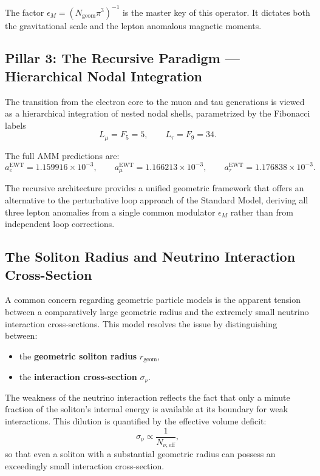 \documentclass[10pt,a4paper]{article}
\begin{document}
The factor \(\epsilon_M = (N_{\text{geom}}\pi^3)^{-1}\) is the master key of this operator. It dictates both the gravitational scale and the lepton anomalous magnetic moments.

\subsection{Pillar 3: The Recursive Paradigm — Hierarchical Nodal Integration}
\label{sec:Pillar3_recursive}

The transition from the electron core to the muon and tau generations is
viewed as a hierarchical integration of nested nodal shells, parametrized
by the Fibonacci labels
\begin{equation}
	L_{\mu} = F_5 = 5,
	\qquad
	L_{\tau} = F_9 = 34.
\end{equation}

The full AMM predictions are:
\begin{equation}
	a_e^{\text{EWT}} = 1.159916 \times 10^{-3},
	\qquad
	a_\mu^{\text{EWT}} = 1.166213 \times 10^{-3},
	\qquad
	a_\tau^{\text{EWT}} = 1.176838 \times 10^{-3}.
\end{equation}

The recursive architecture provides a unified geometric framework that
offers an alternative to the perturbative loop approach of the Standard
Model, deriving all three lepton anomalies from a single common modulator
$\epsilon_M$ rather than from independent loop corrections.

\subsection{The Soliton Radius and Neutrino Interaction Cross-Section}
\label{neutrion_radius_interaction}

A common concern regarding geometric particle models is the apparent tension between a comparatively large geometric radius and the extremely small neutrino interaction cross-sections. This model resolves the issue by distinguishing between:

\begin{itemize}
	\item the \textbf{geometric soliton radius} \(r_{\text{geom}}\),
	\item the \textbf{interaction cross-section} \(\sigma_\nu\).
\end{itemize}

The weakness of the neutrino interaction reflects the fact that only a minute fraction of the soliton's internal energy is available at its boundary for weak interactions. This dilution is quantified by the effective volume deficit:
\begin{equation}
	\sigma_\nu
	\propto
	\frac{1}{N_{\nu,\text{eff}}},
\end{equation}
so that even a soliton with a substantial geometric radius can possess an exceedingly small interaction cross-section.
\end{document}
